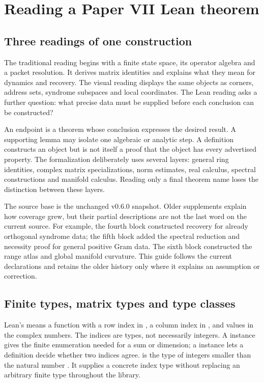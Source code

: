 \section{Reading a Paper VII Lean theorem}
\label{sec:reading}

\subsection{Three readings of one construction}
The traditional reading begins with a finite state space, its operator algebra and a packet resolution. It derives matrix identities and explains what they mean for dynamics and recovery. The visual reading displays the same objects as corners, address sets, syndrome subspaces and local coordinates. The Lean reading asks a further question: what precise data must be supplied before each conclusion can be constructed?

An endpoint is a theorem whose conclusion expresses the desired result. A supporting lemma may isolate one algebraic or analytic step. A definition constructs an object but is not itself a proof that the object has every advertised property. The formalization deliberately uses several layers: general ring identities, complex matrix specializations, norm estimates, real calculus, spectral constructions and manifold calculus. Reading only a final theorem name loses the distinction between these layers.

The source base is the unchanged v0.6.0 snapshot. Older supplements explain how coverage grew, but their partial descriptions are not the last word on the current source. For example, the fourth block constructed recovery for already orthogonal syndrome data; the fifth block added the spectral reduction and necessity proof for general positive Gram data. The sixth block constructed the range atlas and global manifold curvature. This guide follows the current declarations and retains the older history only where it explains an assumption or correction.

\subsection{Finite types, matrix types and type classes}
Lean's  means a function with a row index in , a column index in , and values in the complex numbers. The indices are types, not necessarily integers. A  instance gives the finite enumeration needed for a sum or dimension; a  instance lets a definition decide whether two indices agree.  is the type of integers smaller than the natural number . It supplies a concrete index type without replacing an arbitrary finite type throughout the library.

